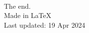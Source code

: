 \documentclass[dvipsnames, svgnames, x11names]{beamer}
\begin{document}
\begin{frame}{ \ }
	\begin{center}
		The end.\\
		Made in \LaTeX\\
		Last updated: 19 Apr 2024
	\end{center}
\end{frame}
\end{document}
